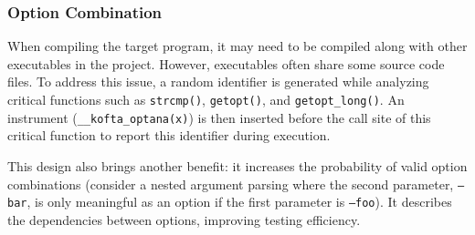 \subsubsection{Option Combination} %

When compiling the target program, it may need to be compiled along with other executables in the project. However, executables often share some source code files.
To address this issue, a random identifier is generated while analyzing critical functions such as \texttt{strcmp()}, \texttt{getopt()}, and \texttt{getopt\_long()}. An instrument (\texttt{\_\_kofta\_optana(x)}) is then inserted before the call site of this critical function to report this identifier during execution.


This design also brings another benefit: it increases the probability of valid option combinations (consider a nested argument parsing where the second parameter, \texttt{--bar}, is only meaningful as an option if the first parameter is \texttt{--foo}). It describes the dependencies between options, improving testing efficiency.

